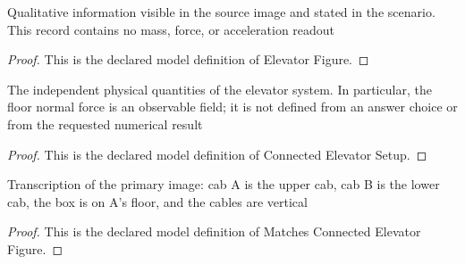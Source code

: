 \begin{definition}
  \label{def:physics:phyx-mini-0762:phyxminiproblems-problemphyxmini0762-elevatorfigure}
  Qualitative information visible in the source image and stated in the scenario. This record contains no mass, force, or acceleration readout
\end{definition}
\begin{proof}
  This is the declared model definition of Elevator Figure.
\end{proof}
\begin{definition}
  \label{def:physics:phyx-mini-0762:phyxminiproblems-problemphyxmini0762-connectedelevatorsetup}
  The independent physical quantities of the elevator system. In particular, the floor normal force is an observable field; it is not defined from an answer choice or from the requested numerical result
\end{definition}
\begin{proof}
  This is the declared model definition of Connected Elevator Setup.
\end{proof}
\begin{definition}
  \label{def:physics:phyx-mini-0762:phyxminiproblems-problemphyxmini0762-matchesconnectedelevatorfigure}
  Transcription of the primary image: cab A is the upper cab, cab B is the lower cab, the box is on A's floor, and the cables are vertical
\end{definition}
\begin{proof}
  This is the declared model definition of Matches Connected Elevator Figure.
\end{proof}
